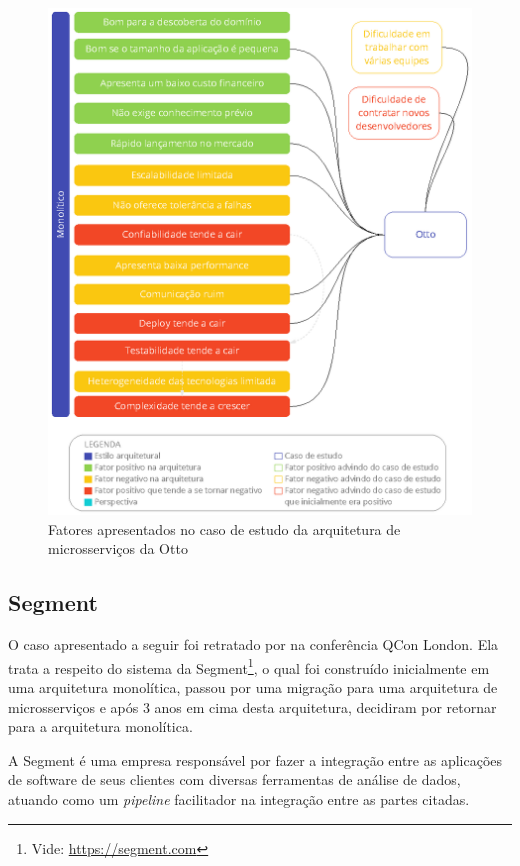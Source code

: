\begin{figure}[h]
  \centering
  \includegraphics[keepaspectratio=true,scale=1]{figuras/monoOtto.eps}
  \caption{Fatores apresentados no caso de estudo da arquitetura de microsserviços da Otto\label{fig:analise-micro-otto}}
\end{figure}

\subsection{Segment}

O caso apresentado a seguir foi retratado por  na
conferência QCon London. Ela trata a respeito do sistema da Segment\footnote{Vide:
\url{https://segment.com}}, o qual foi construído inicialmente em uma arquitetura monolítica,
passou por uma migração para uma arquitetura de microsserviços e após 3 anos em cima desta
arquitetura, decidiram por retornar para a arquitetura monolítica.

A Segment é uma empresa responsável por fazer a integração entre as aplicações de software de seus
clientes com diversas ferramentas de análise de dados, atuando como um \textit{pipeline} facilitador
na integração entre as partes citadas. 


